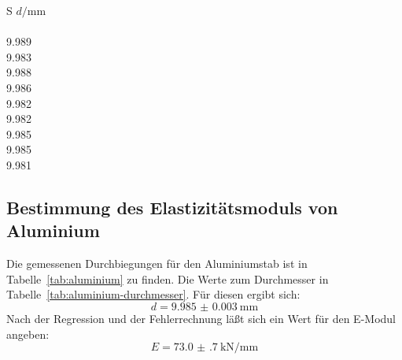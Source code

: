 \begin{table}
  \centering\small
  \begin{tabular}{S}
    \toprule
    {$d/\si{\milli\metre}$}\\
     \\
    9.989 \\
    9.983 \\
    9.988 \\
    9.986 \\
    9.982 \\
    9.982 \\
    9.985 \\
    9.985 \\
    9.981 \\
    \bottomrule
  \end{tabular}
  \caption{Durchmesser des Stahlstabes}
  \label{tab:stahl-durchmesser}
\end{table}

\subsection{Bestimmung des Elastizitätsmoduls von Aluminium}

Die gemessenen Durchbiegungen für den Aluminiumstab ist in
Tabelle~\ref{tab:aluminium} zu finden. Die Werte zum Durchmesser in
Tabelle~\ref{tab:aluminium-durchmesser}. Für diesen ergibt sich:
%
\begin{equation}
  d = \SI{9.985(3)}{\milli\metre}
\end{equation}
%
Nach der Regression und der Fehlerrechnung läßt sich ein Wert für den
E-Modul angeben:
%
\begin{equation}
  E = \SI{73.0(7)}{\kilo\newton\per\milli\metre}
\end{equation}

